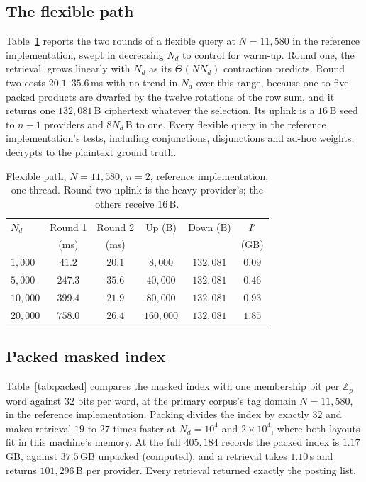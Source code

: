 \documentclass[11pt,a4paper]{article}
\newlength{\tblwidth}\setlength{\tblwidth}{\linewidth}
\begin{document}
\subsection{The flexible path}
\label{sec:flexresult}
Table~\ref{tab:flex} reports the two rounds of a flexible query at
$N=11{,}580$ in the reference implementation, swept in decreasing $N_d$ to
control for warm-up. Round one, the retrieval, grows linearly with $N_d$ as
its $\Theta(NN_d)$ contraction predicts. Round two costs $20.1$--$35.6$\,ms
with no trend in $N_d$ over this range, because one to five packed products are
dwarfed by the twelve rotations of the row sum, and it returns one
$132{,}081$\,B ciphertext whatever the selection. Its uplink is a $16$\,B seed
to $n-1$ providers and $8N_d$\,B to one. Every flexible query in the reference implementation's tests, including
conjunctions, disjunctions and ad-hoc weights, decrypts to the plaintext ground
truth.

\begin{table}[htbp]
\caption{Flexible path, $N=11{,}580$, $n=2$, reference implementation, one
thread. Round-two uplink is the heavy provider's; the others receive 16\,B.}
\label{tab:flex}
\centering
\footnotesize
\setlength{\tabcolsep}{2pt}
\begin{tabular*}{\tblwidth}{@{\extracolsep{\fill}}lccccc@{}}
\toprule
$N_d$ & Round 1 & Round 2 & Up (B) & Down (B) & $I'$ \\
      & (ms)    & (ms)    &        &          & (GB) \\
\midrule
$1{,}000$ & $41.2$ & $20.1$ & $8{,}000$ & $132{,}081$ & $0.09$ \\
$5{,}000$ & $247.3$ & $35.6$ & $40{,}000$ & $132{,}081$ & $0.46$ \\
$10{,}000$ & $399.4$ & $21.9$ & $80{,}000$ & $132{,}081$ & $0.93$ \\
$20{,}000$ & $758.0$ & $26.4$ & $160{,}000$ & $132{,}081$ & $1.85$ \\
\bottomrule
\end{tabular*}
\end{table}

\subsection{Packed masked index}
\label{sec:packedresult}
Table~\ref{tab:packed} compares the masked index with one membership bit per
$\mathbb{Z}_p$ word against $32$ bits per word, at the primary corpus's tag
domain $N=11{,}580$, in the reference implementation. Packing divides the index
by exactly $32$ and makes retrieval $19$ to $27$ times faster at
$N_d=10^4$ and $2\times10^4$, where both layouts fit in this machine's memory.
At the full $405{,}184$ records the packed index is $1.17$\,GB, against
$37.5$\,GB unpacked (computed), and a retrieval takes $1.10$\,s and returns
$101{,}296$\,B per provider. Every retrieval returned exactly the posting list.
\end{document}

